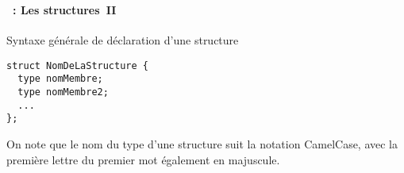 \begin{frame}[containsverbatim]
  \frametitle{\secname}
  \framesubtitle{\subsecname~: Les structures~II} 

  \begin{block}{Syntaxe générale de déclaration d'une structure}
    \begin{verbatim}
struct NomDeLaStructure {
  type nomMembre;
  type nomMembre2;
  ...
};\end{verbatim}
  \end{block}
  \vspace{0.5cm}
  \par
  On note que le nom du type d'une structure suit la notation CamelCase, avec la première lettre du premier mot
  également en majuscule.
\end{frame}

